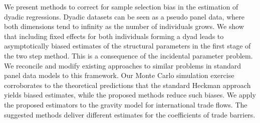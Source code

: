 We present methods to correct for sample selection bias in the estimation of dyadic regressions. Dyadic datasets can be seen as a pseudo panel data, where both dimensions tend to infinity as the number of individuals grows. We show that including fixed effects for both individuals forming a dyad leads to asymptotically biased estimates of the structural parameters in the first stage of the \cite{heckman1979sample} two step method. This is a consequence of the incidental parameter problem. We reconcile and modify existing approaches to similar problems in standard panel data models to this framework. Our Monte Carlo simulation exercise corroborates to the theoretical predictions that the standard Heckman approach yields biased estimates, while the proposed methods reduce such biases. We apply the proposed estimators to the gravity model for international trade flows. The suggested methods deliver different estimates for the coefficients of trade barriers.